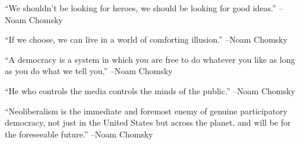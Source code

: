 \documentclass{article}%
\begin{document}
\linebreak%
\vspace{1mm}%
\begin{minipage}{\textwidth}%
\flushleft%
“We shouldn't be looking for heroes, we should be looking for good ideas.”%
\linebreak%
\vspace{1mm}%
–Noam Chomsky%
\linebreak%
\vspace{1mm}%
\end{minipage}%
\linebreak%
\vspace{1mm}%
\begin{minipage}{\textwidth}%
\flushleft%
“If we choose, we can live in a world of comforting illusion.”%
\linebreak%
\vspace{1mm}%
–Noam Chomsky%
\linebreak%
\vspace{1mm}%
\end{minipage}%
\linebreak%
\vspace{1mm}%
\begin{minipage}{\textwidth}%
\flushleft%
“A democracy is a system in which you are free to do whatever you like as long as you do what we tell you.”%
\linebreak%
\vspace{1mm}%
–Noam Chomsky%
\linebreak%
\vspace{1mm}%
\end{minipage}%
\linebreak%
\vspace{1mm}%
\begin{minipage}{\textwidth}%
\flushleft%
“He who controls the media controls the minds of the public.”%
\linebreak%
\vspace{1mm}%
–Noam Chomsky%
\linebreak%
\vspace{1mm}%
\end{minipage}%
\linebreak%
\vspace{1mm}%
\begin{minipage}{\textwidth}%
\flushleft%
“Neoliberalism is the immediate and foremost enemy of genuine participatory democracy, not just in the United States but across the planet, and will be for the foreseeable future.”%
\linebreak%
\vspace{1mm}%
–Noam Chomsky%
\linebreak%
\vspace{1mm}%
\end{minipage}%
\end{document}
